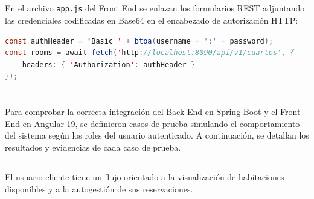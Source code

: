 \documentclass[10pt,a4paper]{article}
\begin{document}
\subsection{\textit{\color{colorESCOM}{Integración en la SPA (Front End)}}}
En el archivo \texttt{app.js} del Front End se enlazan los formularios REST adjuntando las credenciales codificadas en Base64 en el encabezado de autorización HTTP:
\begin{lstlisting}[language=Java]
const authHeader = 'Basic ' + btoa(username + ':' + password);
const rooms = await fetch('http://localhost:8090/api/v1/cuartos', {
    headers: { 'Authorization': authHeader }
});
\end{lstlisting}

\pagebreak

\section{\color{colorIPN}{Resultados e Integración}}

Para comprobar la correcta integración del Back End en Spring Boot y el Front End en Angular 19, se definieron casos de prueba simulando el comportamiento del sistema según los roles del usuario autenticado. A continuación, se detallan los resultados y evidencias de cada caso de prueba.

\subsection{\color{colorESCOM}{Flujo de Trabajo del Cliente (ROLE\_USER)}}

\noindent El usuario cliente tiene un flujo orientado a la visualización de habitaciones disponibles y a la autogestión de sus reservaciones.
\end{document}
